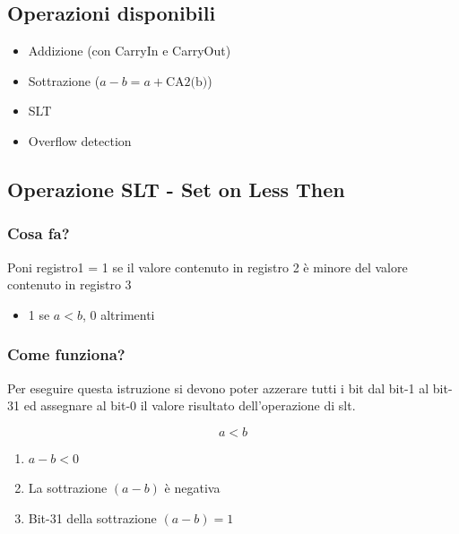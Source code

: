 \begin{center}
\end{center}

\newpage
\subsection{Operazioni disponibili}
\begin{itemize}
    \item Addizione (con CarryIn e CarryOut)
    \item Sottrazione ($a-b = a + \text{CA2(b)}$)
    \item SLT
    \item Overflow detection
\end{itemize}

\subsection{Operazione SLT - Set on Less Then}
\subsubsection{Cosa fa?}
Poni registro1 = 1 se il valore contenuto in registro 2 è minore del valore contenuto in registro 3
\begin{itemize}
    \item 1 se $a<b$, $0$ altrimenti
\end{itemize}

\subsubsection{Come funziona?}
Per eseguire questa istruzione si devono poter azzerare tutti i bit dal bit-1 al bit-31 ed assegnare al bit-0 il valore risultato dell'operazione di slt.

\begin{minipage}{0.45\textwidth}
{
    \Large
    $$
        a<b
    $$
}
\end{minipage}
\hfil
\begin{minipage}{0.45\textwidth}
    \begin{enumerate}
        \item $a-b<0$
        \item La sottrazione $(a-b)$ è negativa
        \item Bit-31 della sottrazione $(a-b)=1$
    \end{enumerate}
\end{minipage}

